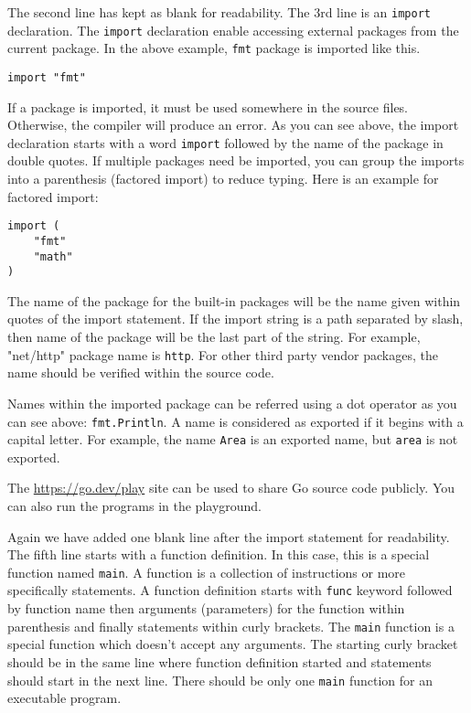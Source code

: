 The second line has kept as blank for readability.  The 3rd line is an
\texttt{import} declaration.  The \texttt{import} declaration enable accessing
external packages from the current package.  In the above example,
\texttt{fmt} package is imported like this.

\begin{lstlisting}[numbers=none]
import "fmt"
\end{lstlisting}

If a package is imported, it must be used somewhere in the source
files.  Otherwise, the compiler will produce an error.  As you can see
above, the import declaration starts with a word \texttt{import}
followed by the name of the package in double quotes.  If multiple
packages need be imported, you can group the imports into a
parenthesis (factored import) to reduce typing.  Here is an example
for factored import:

\begin{lstlisting}[numbers=none]
import (
    "fmt"
    "math"
)
\end{lstlisting}

The name of the package for the built-in packages will be the name given within
quotes of the import statement. If the import string is a path separated by
slash, then name of the package will be the last part of the string. For
example, "net/http" package name is \texttt{http}. For other third party vendor
packages, the name should be verified within the source code.

Names within the imported package can be referred using a dot operator as you
can see above: \texttt{fmt.Println}. A name is considered as exported if it
begins with a capital letter. For example, the name
\texttt{Area} is an exported name, but \texttt{area} is not exported.

The \url{https://go.dev/play} site can be used to share Go source code publicly.
You can also run the programs in the playground.

Again we have added one blank line after the import statement for readability.
The fifth line starts with a function definition. In this case, this is a
special function named \texttt{main}. A function is a collection of instructions
or more specifically statements. A function definition starts with \texttt{func}
keyword followed by function name then arguments (parameters) for the function
within parenthesis and finally statements within curly brackets.
The \texttt{main} function is a special function which doesn't accept any
arguments. The starting curly bracket should be in the same line where function
definition started and statements should start in the next line. There should be
only one \texttt{main} function for an executable program.

